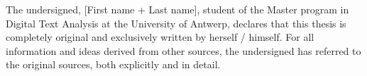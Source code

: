 \thispagestyle{plain}
\begin{center}

The undersigned, [First name + Last name], student of the Master program in Digital Text Analysis at the University of Antwerp, declares that this thesis is completely original and exclusively written by herself / himself. For all information and ideas derived from other sources, the undersigned has referred to the original sources, both explicitly and in detail.
 
\end{center}
